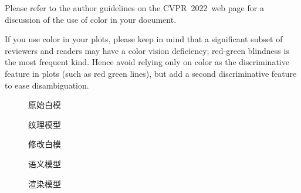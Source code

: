 \documentclass[10pt,twocolumn,letterpaper]{article}
\def\confName{CVPR}
\def\confYear{2022}
\begin{document}
Please refer to the author guidelines on the \confName\ \confYear\ web page for a discussion of the use of color in your document.

If you use color in your plots, please keep in mind that a significant subset of reviewers and readers may have a color vision deficiency; red-green blindness is the most frequent kind.
Hence avoid relying only on color as the discriminative feature in plots (such as red \vs green lines), but add a second discriminative feature to ease disambiguation.
\begin{figure}[htbp]
  \centering


  \begin{minipage}[b]{0.19\textwidth}
      \centering
      \caption*{原始白模}
  \end{minipage}
  \hfill
  \begin{minipage}[b]{0.19\textwidth}
      \centering
      
      \caption*{纹理模型}
  \end{minipage}
  \hfill
  \begin{minipage}[b]{0.19\textwidth}
      \centering
      \caption*{修改白模}
  \end{minipage}
  \hfill
  \begin{minipage}[b]{0.19\textwidth}
      \centering
      \caption*{语义模型}
  \end{minipage}\hfill
  \begin{minipage}[b]{0.19\textwidth}
      \centering
      \caption*{渲染模型}
  \end{minipage}

  \centering


\end{figure}
\end{document}
